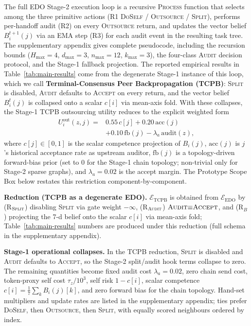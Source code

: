 \documentclass[11pt]{article}
\begin{document}
The full EDO Stage-2 execution loop is a recursive \textsc{Process} function that selects among the three primitive actions (R1 \textsc{DoSelf} / \textsc{Outsource} / \textsc{Split}), performs per-handoff audit (R2) on every \textsc{Outsource} return, and updates the vector belief $B_i^{t+1}(j)$ via an EMA step (R3) for each audit event in the resulting task tree. The supplementary appendix gives complete pseudocode, including the recursion bounds ($H_{\max}{=}4$, $d_{\max}{=}3$, $n_{\max}{=}12$, $k_{\max}{=}3$), the four-class \textsc{Audit} decision protocol, and the Stage-1 fallback projection. The reported empirical results in Table~\ref{tab:main-results} come from the degenerate Stage-1 instance of this loop, which we call \textbf{Terminal-Consensus Peer Backpropagation (TCPB)}: \textsc{Split} is disabled, \textsc{Audit} defaults to \textsc{Accept} on every return, and the vector belief $B_i^t(j)$ is collapsed onto a scalar $c[i]$ via mean-axis fold. With these collapses, the Stage-1 TCPB outsourcing utility reduces to the explicit weighted form
\[
\begin{aligned}
U^{\text{out}}_i(z, j) ={}& 0.55\,c[j] + 0.20\,\mathrm{acc}(j)\\
&+ 0.10\,\mathrm{fb}(j) - \lambda_a\,\mathrm{audit}(z),
\end{aligned}
\]
where $c[j]\in[0,1]$ is the scalar competence projection of $B_i(j)$, $\mathrm{acc}(j)$ is $j$'s historical acceptance rate as upstream auditor, $\mathrm{fb}(j)$ is a topology-driven forward-bias prior (set to $0$ for the Stage-1 chain topology; non-trivial only for Stage-2 sparse graphs), and $\lambda_a{=}0.02$ is the accept margin. The Prototype Scope Box below restates this restriction component-by-component.

\textbf{Reduction (TCPB as a degenerate EDO).} $\mathcal{E}_{\mathrm{TCPB}}$ is obtained from $\mathcal{E}_{\mathrm{EDO}}$ by (R$_\textsc{Split}$) disabling \textsc{Split} via gate weight $-\infty$, (R$_\textsc{Audit}$) $\textsc{Audit}{\equiv}\textsc{Accept}$, and (R$_B$) projecting the 7-d belief onto the scalar $c[i]$ via mean-axis fold; Table~\ref{tab:main-results} numbers are produced under this reduction (full schema in the supplementary appendix).

\textbf{Stage-1 operational collapses.} In the TCPB reduction, \textsc{Split} is disabled and \textsc{Audit} defaults to \textsc{Accept}, so the Stage-2 split/audit hook terms collapse to zero. The remaining quantities become fixed audit cost $\lambda_a{=}0.02$, zero chain send cost, token-proxy self cost $\tau_z/10^3$, self risk $1{-}c[i]$, scalar competence $c[i]{=}\tfrac{1}{7}\sum_k B_i(j)[k]$, and zero forward bias for the chain topology. Hand-set multipliers and update rates are listed in the supplementary appendix; ties prefer \textsc{DoSelf}, then \textsc{Outsource}, then \textsc{Split}, with equally scored neighbours ordered by index.
\end{document}
